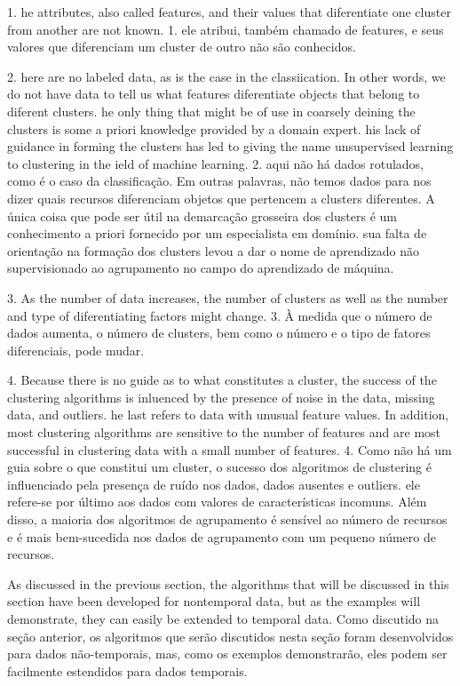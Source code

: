 1. he attributes, also called features, and their values that diferentiate one cluster from another are not known.
1. ele atribui, também chamado de features, e seus valores que diferenciam um cluster de outro não são conhecidos.

2. here are no labeled data, as is the case in the classiication. In other words, we do not have data to tell us what features diferentiate objects that belong to diferent clusters. he only thing that might be of use in coarsely deining the clusters is some a priori knowledge provided by a domain expert. his lack of guidance in forming the clusters has led to giving the name unsupervised learning to clustering in the ield of machine learning.
2. aqui não há dados rotulados, como é o caso da classificação. Em outras palavras, não temos dados para nos dizer quais recursos diferenciam objetos que pertencem a clusters diferentes. A única coisa que pode ser útil na demarcação grosseira dos clusters é um conhecimento a priori fornecido por um especialista em domínio. sua falta de orientação na formação dos clusters levou a dar o nome de aprendizado não supervisionado ao agrupamento no campo do aprendizado de máquina.

3. As the number of data increases, the number of clusters as well as the number and type of diferentiating factors might change.
3. À medida que o número de dados aumenta, o número de clusters, bem como o número e o tipo de fatores diferenciais, pode mudar.

4. Because there is no guide as to what constitutes a cluster, the success of the clustering algorithms is inluenced by the presence of noise in the data, missing data, and outliers. he last refers to data with unusual feature values. In addition, most clustering algorithms are sensitive to the number of features and are most successful in clustering data with a small number of features.
4. Como não há um guia sobre o que constitui um cluster, o sucesso dos algoritmos de clustering é influenciado pela presença de ruído nos dados, dados ausentes e outliers. ele refere-se por último aos dados com valores de características incomuns. Além disso, a maioria dos algoritmos de agrupamento é sensível ao número de recursos e é mais bem-sucedida nos dados de agrupamento com um pequeno número de recursos.

As discussed in the previous section, the algorithms that will be discussed in this section have been developed for nontemporal data, but as the examples will demonstrate, they can easily be extended to temporal data.
Como discutido na seção anterior, os algoritmos que serão discutidos nesta seção foram desenvolvidos para dados não-temporais, mas, como os exemplos demonstrarão, eles podem ser facilmente estendidos para dados temporais.

